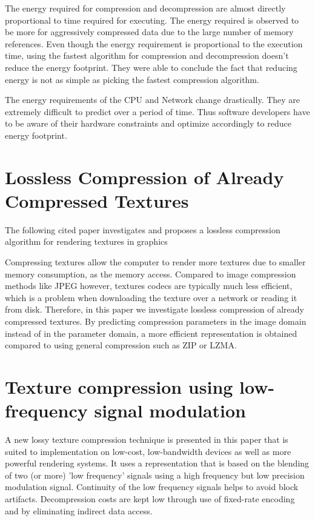 \documentclass{article}
\begin{document}
The energy required for compression and decompression are almost directly proportional to time required for executing. The energy required is observed to be more for aggressively compressed data due to the large number of memory references. Even though the energy requirement is proportional to the execution time, using the fastest algorithm for compression and decompression doesn't reduce the energy footprint. They were able to conclude the fact that reducing energy is not as simple as picking the fastest compression algorithm.

The energy requirements of the CPU and Network change drastically. They are extremely difficult to predict over a period of time. Thus software developers have to be aware of their hardware constraints and optimize accordingly to reduce energy footprint. 

\section{Lossless Compression of Already Compressed Textures \cite{strom2011lossless}}

The following cited paper investigates and proposes a lossless compression algorithm for rendering textures in graphics

Compressing textures allow the computer to render more textures due to smaller memory consumption, as the memory access. Compared to image compression methods like JPEG however, textures codecs are typically much less efficient, which is a problem when downloading the texture over a network or reading it from disk. Therefore, in this paper we investigate lossless compression of already compressed textures. By predicting compression parameters in the image domain instead of in the parameter domain, a more efficient representation is obtained compared to using general compression such as ZIP or LZMA.

\section{Texture compression using low-frequency signal modulation \cite{10.5555/844174.844187}}

A new lossy texture compression technique is presented in this paper that is suited to implementation on low-cost, low-bandwidth devices as well as more powerful rendering systems. It uses a representation that is based on the blending of two (or more) 'low frequency' signals using a high frequency but low precision modulation signal. Continuity of the low frequency signals helps to avoid block artifacts. Decompression costs are kept low through use of fixed-rate encoding and by eliminating indirect data access.
\end{document}
